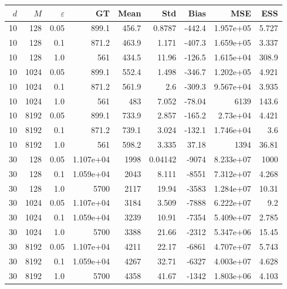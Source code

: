 \documentclass{article}
\begin{document}
\begin{table}[htbp]
\centering
\scriptsize
\setlength{\tabcolsep}{4pt}
\begin{tabular}{rrr|rrrrrr}
\toprule
$d$ & $M$ & $\varepsilon$ & GT & Mean & Std & Bias & MSE & ESS \\
\midrule
\rowcolor{orange!50}10 & 128 & 0.05 & 899.1 & 456.7 & 0.8787 & -442.4 & 1.957e+05 & 5.727 \\
\rowcolor{orange!50}10 & 128 & 0.1 & 871.2 & 463.9 & 1.171 & -407.3 & 1.659e+05 & 3.337 \\
\rowcolor{yellow!40}10 & 128 & 1.0 & 561 & 434.5 & 11.96 & -126.5 & 1.615e+04 & 308.9 \\
\midrule
\rowcolor{orange!50}10 & 1024 & 0.05 & 899.1 & 552.4 & 1.498 & -346.7 & 1.202e+05 & 4.921 \\
\rowcolor{orange!50}10 & 1024 & 0.1 & 871.2 & 561.9 & 2.6 & -309.3 & 9.567e+04 & 3.935 \\
\rowcolor{yellow!40}10 & 1024 & 1.0 & 561 & 483 & 7.052 & -78.04 & 6139 & 143.6 \\
\midrule
\rowcolor{yellow!40}10 & 8192 & 0.05 & 899.1 & 733.9 & 2.857 & -165.2 & 2.73e+04 & 4.421 \\
\rowcolor{yellow!40}10 & 8192 & 0.1 & 871.2 & 739.1 & 3.024 & -132.1 & 1.746e+04 & 3.6 \\
10 & 8192 & 1.0 & 561 & 598.2 & 3.335 & 37.18 & 1394 & 36.81 \\
\midrule
\rowcolor{red!40}30 & 128 & 0.05 & 1.107e+04 & 1998 & 0.04142 & -9074 & 8.233e+07 & 1000 \\
\rowcolor{red!40}30 & 128 & 0.1 & 1.059e+04 & 2043 & 8.111 & -8551 & 7.312e+07 & 4.268 \\
\rowcolor{red!40}30 & 128 & 1.0 & 5700 & 2117 & 19.94 & -3583 & 1.284e+07 & 10.31 \\
\midrule
\rowcolor{red!40}30 & 1024 & 0.05 & 1.107e+04 & 3184 & 3.509 & -7888 & 6.222e+07 & 9.2 \\
\rowcolor{red!40}30 & 1024 & 0.1 & 1.059e+04 & 3239 & 10.91 & -7354 & 5.409e+07 & 2.785 \\
\rowcolor{orange!50}30 & 1024 & 1.0 & 5700 & 3388 & 21.66 & -2312 & 5.347e+06 & 15.45 \\
\midrule
\rowcolor{red!40}30 & 8192 & 0.05 & 1.107e+04 & 4211 & 22.17 & -6861 & 4.707e+07 & 5.743 \\
\rowcolor{red!40}30 & 8192 & 0.1 & 1.059e+04 & 4267 & 32.71 & -6327 & 4.003e+07 & 4.628 \\
\rowcolor{yellow!40}30 & 8192 & 1.0 & 5700 & 4358 & 41.67 & -1342 & 1.803e+06 & 4.103 \\

\end{tabular}
\end{table}
\end{document}
